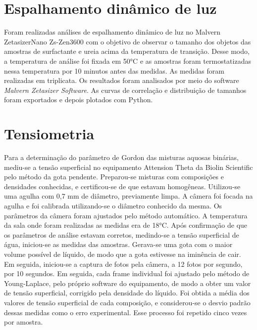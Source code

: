 		\section{Espalhamento dinâmico de luz} 
		
		Foram realizadas análises de espalhamento dinâmico de luz no Malvern ZetasizerNano Zs-Zen3600 com o objetivo de observar o tamanho dos objetos das amostras de surfactante e ureia acima da temperatura de transição. Desse modo, a temperatura de análise foi fixada em 50°C e as amostras foram termostatizadas nessa temperatura por 10 minutos antes das medidas. As medidas foram realizadas em triplicata. Os resultados foram analisados por meio do software \emph{Malvern Zetasizer Software}. As curvas de correlação e distribuição de tamanhos foram exportados e depois plotados com Python.
		
		\section{Tensiometria} 
		
		Para a determinação do parâmetro de Gordon das misturas aquosas binárias, mediu-se a tensão superficial no equipamento Attension Theta da Biolin Scientific pelo método da gota pendente. Preparou-se misturas com composições e densidades conhecidas, e certificou-se de que estavam homogêneas. Utilizou-se uma agulha com 0,7 mm de diâmetro, previamente limpa. A câmera foi focada na agulha e foi calibrada utilizando-se o diâmetro conhecido da mesma. Os parâmetros da câmera foram ajustados pelo método automático. A temperatura da sala onde foram realizadas as medidas era de 18°C. Após confirmação de que os parâmetros de análise estavam corretos, medindo-se a tensão superficial de água, iniciou-se as medidas das amostras. Gerava-se uma gota com o maior volume possível de líquido, de modo que a gota estivesse na iminência de cair. Em seguida, iniciou-se a captura de fotos pela câmera, a 12 fotos por segundo, por 10 segundos. Em seguida, cada frame individual foi ajustado pelo método de Young-Laplace, pelo próprio software do equipamento, de modo a obter um valor de tensão superficial, corrigido pela densidade do líquido. Foi obtida a média dos valores de tensão superficial de cada composição, e considerou-se o desvio padrão dessas medidas como o erro experimental. Esse processo foi repetido cinco vezes por amostra.